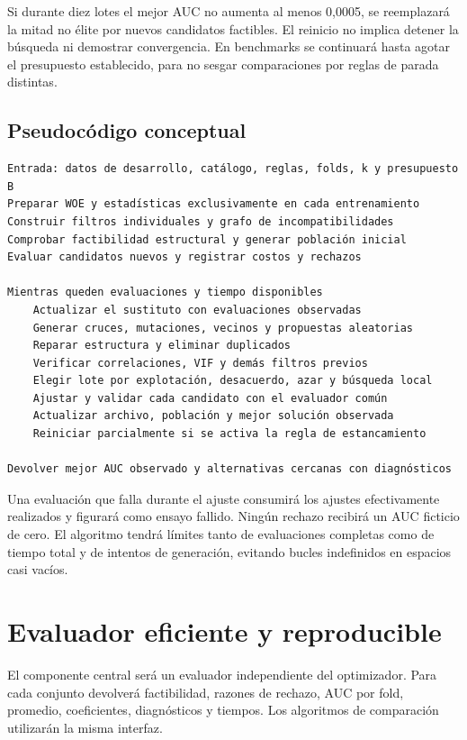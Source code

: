 \documentclass[11pt,letterpaper]{article}
\begin{document}
Si durante diez lotes el mejor AUC no aumenta al menos 0,0005, se reemplazará la mitad no élite por nuevos candidatos factibles. El reinicio no implica detener la búsqueda ni demostrar convergencia. En benchmarks se continuará hasta agotar el presupuesto establecido, para no sesgar comparaciones por reglas de parada distintas.

\subsection{Pseudocódigo conceptual}\label{sec:6.7}

{\small
\begin{verbatim}
Entrada: datos de desarrollo, catálogo, reglas, folds, k y presupuesto B
Preparar WOE y estadísticas exclusivamente en cada entrenamiento
Construir filtros individuales y grafo de incompatibilidades
Comprobar factibilidad estructural y generar población inicial
Evaluar candidatos nuevos y registrar costos y rechazos

Mientras queden evaluaciones y tiempo disponibles
    Actualizar el sustituto con evaluaciones observadas
    Generar cruces, mutaciones, vecinos y propuestas aleatorias
    Reparar estructura y eliminar duplicados
    Verificar correlaciones, VIF y demás filtros previos
    Elegir lote por explotación, desacuerdo, azar y búsqueda local
    Ajustar y validar cada candidato con el evaluador común
    Actualizar archivo, población y mejor solución observada
    Reiniciar parcialmente si se activa la regla de estancamiento

Devolver mejor AUC observado y alternativas cercanas con diagnósticos
\end{verbatim}
}

Una evaluación que falla durante el ajuste consumirá los ajustes efectivamente realizados y figurará como ensayo fallido. Ningún rechazo recibirá un AUC ficticio de cero. El algoritmo tendrá límites tanto de evaluaciones completas como de tiempo total y de intentos de generación, evitando bucles indefinidos en espacios casi vacíos.

\section{Evaluador eficiente y reproducible}\label{sec:7}

El componente central será un evaluador independiente del optimizador. Para cada conjunto devolverá factibilidad, razones de rechazo, AUC por fold, promedio, coeficientes, diagnósticos y tiempos. Los algoritmos de comparación utilizarán la misma interfaz.
\end{document}
